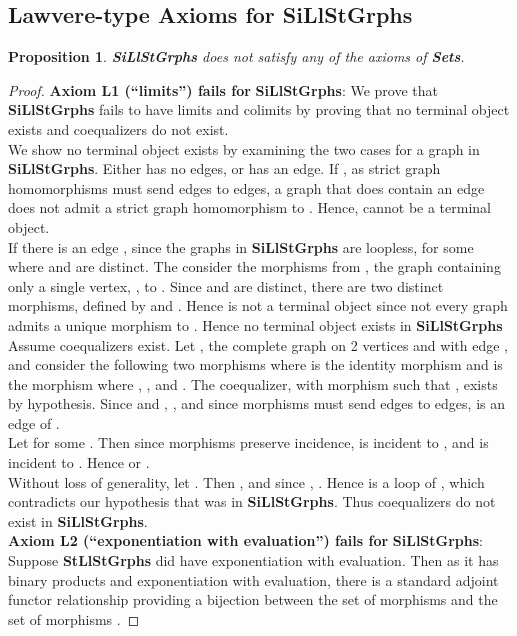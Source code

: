 \documentclass[11pt]{article}
\newtheorem{proposition}[theorem]{Proposition}
\begin{document}
\subsection{Lawvere-type Axioms for \textbf{SiLlStGrphs}}
\begin{proposition}
\textbf{SiLlStGrphs} does not satisfy any of the axioms of \textbf{Sets}.
\end{proposition}
\begin{proof}
\textbf{Axiom L1 (``limits'') fails for} \textbf{SiLlStGrphs}: We prove that \textbf{SiLlStGrphs} fails to have limits and colimits by proving that no terminal object exists and coequalizers do not exist.\\
\indent We show no terminal object exists by examining the two cases for a graph  in \textbf{SiLlStGrphs}. Either  has no edges, or  has an edge. If , as strict graph homomorphisms must send edges to edges, a graph that does contain an edge does not admit a strict graph homomorphism to . Hence,  cannot be a terminal object.\\
\indent If there is an edge , since the graphs in \textbf{SiLlStGrphs} are loopless, \textunderscore for some  where  and  are distinct. The consider the morphisms from , the graph containing only a single vertex, , to . Since  and  are distinct, there are two distinct morphisms,  defined by  and . Hence  is not a terminal object since not every graph admits a unique morphism to . Hence no terminal object exists in \textbf{SiLlStGrphs}\\
\indent Assume coequalizers exist. Let , the complete graph on 2 vertices  and  with edge , and consider the following two morphisms  where  is the identity morphism and  is the morphism where , , and . The coequalizer,  with morphism  such that , exists by hypothesis. Since  and , , and since morphisms must send edges to edges,  is an edge of .\\
\indent Let \textunderscore for some . Then since morphisms preserve incidence,  is incident to , and  is incident to . Hence  or .\\
\indent Without loss of generality, let . Then , and since , . Hence  is a loop of , which contradicts our hypothesis that  was in \textbf{SiLlStGrphs}. Thus coequalizers do not exist in \textbf{SiLlStGrphs}.\\
\indent \textbf{Axiom L2 (``exponentiation with evaluation'') fails for} \textbf{SiLlStGrphs}: Suppose \textbf{StLlStGrphs} did have exponentiation with evaluation. Then as it has binary products and exponentiation with evaluation, there is a standard adjoint functor relationship providing a bijection between the set of morphisms  and the set of morphisms .\par

\end{proof}
\end{document}
